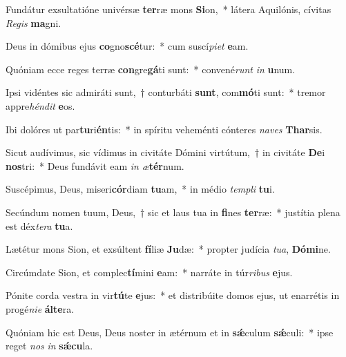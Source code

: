 \item Fundátur exsultatióne univérsæ \textbf{ter}ræ mons \textbf{Si}on,~* látera Aquilónis, cívitas \textit{Re}\textit{gis} \textbf{ma}gni.
\item Deus in dómibus ejus \textbf{co}gno\textbf{scé}tur:~* cum suscí\textit{pi}\textit{et} \textbf{e}am.
\item Quóniam ecce reges terræ \textbf{con}gre\textbf{gá}ti sunt:~* convené\textit{runt} \textit{in} \textbf{u}num.
\item Ipsi vidéntes sic admiráti sunt,~† conturbáti \textbf{sunt}, com\textbf{mó}ti sunt:~* tremor appre\textit{hén}\textit{dit} \textbf{e}os.
\item Ibi dolóres ut par\textbf{tu}ri\textbf{én}tis:~* in spíritu veheménti cónteres \textit{na}\textit{ves} \textbf{Thar}sis.
\item Sicut audívimus, sic vídimus in civitáte Dómini virtútum,~† in civitáte \textbf{De}i \textbf{nos}tri:~* Deus fundávit eam \textit{in} \textit{æ}\textbf{tér}num.
\item Suscépimus, Deus, miseri\textbf{cór}diam \textbf{tu}am,~* in médio \textit{tem}\textit{pli} \textbf{tu}i.
\item Secúndum nomen tuum, Deus,~† sic et laus tua in \textbf{fi}nes \textbf{ter}ræ:~* justítia plena est déx\textit{te}\textit{ra} \textbf{tu}a.
\item Lætétur mons Sion, et exsúltent \textbf{fí}liæ \textbf{Ju}dæ:~* propter judícia \textit{tu}\textit{a}, \textbf{Dó}\textbf{mi}ne.
\item Circúmdate Sion, et complec\textbf{tí}mini \textbf{e}am:~* narráte in túr\textit{ri}\textit{bus} \textbf{e}jus.
\item Pónite corda vestra in vir\textbf{tú}te \textbf{e}jus:~* et distribúite domos ejus, ut enarrétis in progé\textit{ni}\textit{e} \textbf{ál}\textbf{te}ra.
\item Quóniam hic est Deus, Deus noster in ætérnum et in \textbf{sǽ}culum \textbf{sǽ}culi:~* ipse reget \textit{nos} \textit{in} \textbf{sǽ}\textbf{cu}la.
